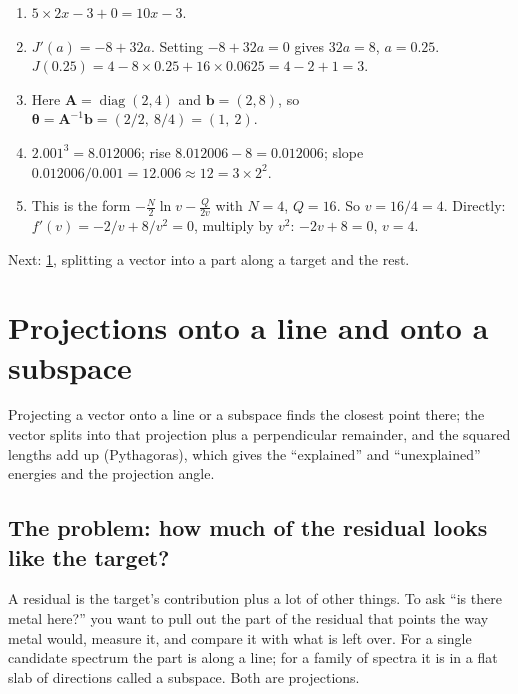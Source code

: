 \documentclass[11pt,a4paper,oneside,openany]{book}
\newcommand{\B}[1]{{\symbf{#1}}}
\newcommand{\B}[1]{{\bm{#1}}}
\newcommand{\vb}{\B{b}}
\newcommand{\vtheta}{\B{\theta}}
\newcommand{\mA}{\B{A}}
\newcommand{\nextchapter}[1]{\par\medskip\noindent\hfill\textsf{\small Next: #1}\par}
\begin{document}
\begin{answers}
\begin{enumerate}
\item $5\times2x-3+0=10x-3$.
\item $J'(a)=-8+32a$. Setting $-8+32a=0$ gives $32a=8$, $a=0.25$. $J(0.25)=4-8\times0.25+16\times0.0625=4-2+1=3$.
\item Here $\mA=\operatorname{diag}(2,4)$ and $\vb=(2,8)$, so $\vtheta=\mA^{-1}\vb=(2/2,\ 8/4)=(1,\ 2)$.
\item $2.001^3=8.012006$; rise $8.012006-8=0.012006$; slope $0.012006/0.001=12.006\approx12=3\times2^2$.
\item This is the form $-\frac N2\ln v-\frac Q{2v}$ with $N=4$, $Q=16$. So $v=16/4=4$. Directly: $f'(v)=-2/v+8/v^2=0$, multiply by
  $v^2$: $-2v+8=0$, $v=4$.
\end{enumerate}
\end{answers}

\nextchapter{\cref{ch:proj}, splitting a vector into a part along a target and the rest.}

\chapter{Projections onto a line and onto a subspace}
\label{ch:proj}

\begin{onething}
Projecting a vector onto a line or a subspace finds the closest point there; the vector splits into that projection plus a
perpendicular remainder, and the squared lengths add up (Pythagoras), which gives the ``explained'' and ``unexplained''
energies and the projection angle.
\end{onething}

\section{The problem: how much of the residual looks like the target?}

A residual is the target's contribution plus a lot of other things. To ask ``is there metal here?'' you want to pull out the part
of the residual that points the way metal would, measure it, and compare it with what is left over. For a single candidate
spectrum the part is along a line; for a family of spectra it is in a flat slab of directions called a subspace. Both are
projections.
\end{document}
